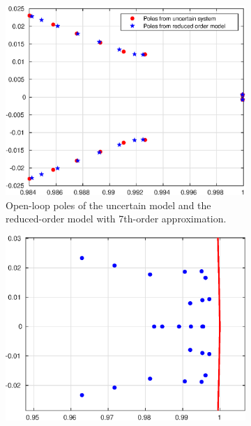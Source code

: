 \documentclass[letterpaper, 10 pt, conference]{ieeeconf}  %
\begin{document}
%
%
%
%
%




\begin{figure}[h!]
\begin{subfigure}[t]{0.23\textwidth}
   \includegraphics[width=\textwidth]{figs/openLoopPoles.eps}
   \caption{Open-loop poles of the uncertain model and the reduced-order model with 7th-order approximation.}
   \label{olPoles}
   \end{subfigure}\hfill
   \begin{subfigure}[t]{0.23\textwidth}
    \includegraphics[width=\textwidth]{figs/clLoopPoles.eps}

\end{subfigure}
\end{figure}
\end{document}
